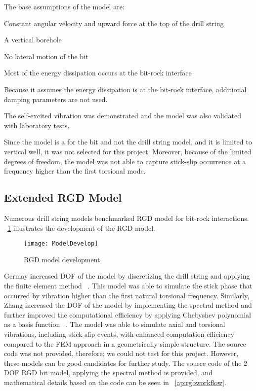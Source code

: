 The base assumptions of the model are:
\begin{bulletedlist}
	\item Constant angular velocity and upward force at the top of the drill string
	\item A vertical borehole
	\item No lateral motion of the bit
	\item Most of the energy dissipation occurs at the bit-rock interface
\end{bulletedlist}
Because it assumes the energy dissipation is at the bit-rock interface, additional damping parameters are not used.

The self-excited vibration was demonstrated and the model was also validated with laboratory tests. \needsclarification[Wording?]

Since the model is a for the bit and not the drill string model, and it is limited to vertical well, it was not selected for this project. Moreover, because of the limited degrees of freedom, the model was not able to capture stick-slip occurrence at a frequency higher than the first torsional mode. 

\subsection{Extended RGD Model}
Numerous drill string models benchmarked RGD model for bit-rock interactions. \figurename~\ref{model_develop_figure} illustrates the development of the RGD model.
\begin{figure}
  \centering
  \texttt{[image: ModelDevelop]}
  \caption[RGD model development]{RGD model development.}\label{model_develop_figure}
\end{figure} 
Germay increased DOF  of the model by discretizing the drill string and applying the finite element method ~\cite{ref:germay2009a}. This model was able to simulate the stick  phase that occurred by vibration higher than the first natural torsional frequency. Similarly, Zhang increased the DOF of the model by implementing the spectral method and further improved the computational efficiency by applying Chebyshev polynomial as a basis function ~\cite{ref:zhang2020a}. The model was able to simulate axial and torsional vibrations, including stick-slip events, with enhanced computation efficiency compared to the FEM approach in a geometrically simple structure. The source code was not provided, therefore; we could not test for this project.  However, these models can be good candidates for further study. The source code of the 2 DOF RGD bit model, applying the spectral method is provided, and mathematical details based on the code can be seen in \appendixname~\ref{ap:rgbworkflow}.  